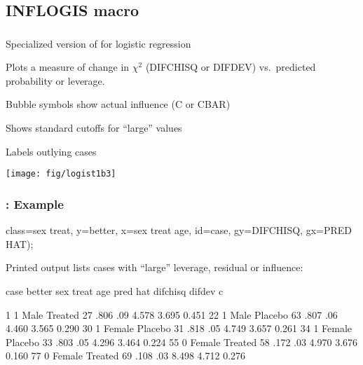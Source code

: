 \subsection{INFLOGIS macro}
\begin{frame}
  \frametitle{}
  \begin{itemize*}
	\item Specialized version of  for logistic regression
	\item Plots a measure of change in $\chi^2$ (DIFCHISQ or DIFDEV) vs.\
	predicted probability or leverage.
	\item Bubble symbols show actual influence (C or CBAR)
	\item Shows standard cutoffs for ``large'' values
	\item Labels outlying cases
  \end{itemize*}
 \begin{center}
  \texttt{[image: fig/logist1b3]}
 \end{center}

\end{frame}

\begin{frame}[fragile]
  \frametitle{: Example}
\begin{Input}
   class=sex treat,      
   y=better,             
   x=sex treat age,      
   id=case,              
   gy=DIFCHISQ,          
   gx=PRED HAT);         
\end{Input}
Printed output lists cases with ``large'' leverage, residual or influence:

\begin{Output}[gobble=4,fontsize=\footnotesize]
    case better  sex    treat  age pred  hat difchisq difdev    c

      1     1   Male   Treated  27 .806  .09   4.578   3.695  0.451
     22     1   Male   Placebo  63 .807  .06   4.460   3.565  0.290
     30     1   Female Placebo  31 .818  .05   4.749   3.657  0.261
     34     1   Female Placebo  33 .803  .05   4.296   3.464  0.224
     55     0   Female Treated  58 .172  .03   4.970   3.676  0.160
     77     0   Female Treated  69 .108  .03   8.498   4.712  0.276
\end{Output}
 
\end{frame}

